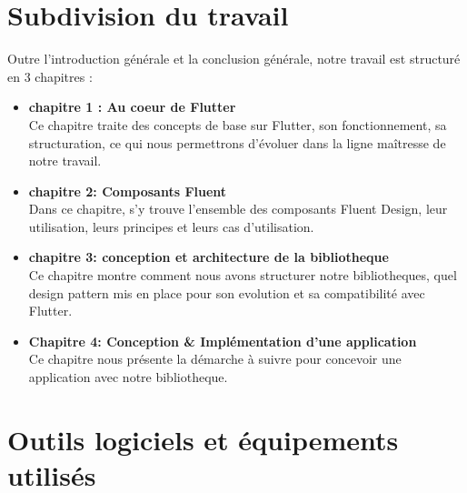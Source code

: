 \documentclass[a4paper,12pt]{report}
\begin{document}
                
            \section*{Subdivision du travail}
                Outre l’introduction générale et la conclusion générale, 
                notre travail est structuré en 3 chapitres :
                \begin{itemize}
                    \item \textbf{chapitre 1 : Au coeur de Flutter}
                    \\
                        Ce chapitre traite des concepts de base sur Flutter, son fonctionnement, sa structuration,  
                        ce qui nous permettrons
                        d’évoluer dans la ligne maîtresse de notre travail.
                    

                    \item \textbf{chapitre 2: Composants Fluent}
                    \\
                        Dans ce chapitre, s'y trouve l'ensemble des composants Fluent Design,
                        leur utilisation, leurs principes et leurs cas d'utilisation.
                    
                    
                    \item \textbf{chapitre 3: conception et architecture de la bibliotheque}
                    \\
                        Ce chapitre montre comment nous avons structurer notre bibliotheques,
                        quel design pattern mis en place pour son evolution et sa compatibilité avec Flutter.
                    
                    
                    \item \textbf{Chapitre 4: Conception & Implémentation d'une application }
                    \\
                        Ce chapitre nous présente la démarche à suivre pour concevoir une
                        application avec notre bibliotheque.
                        
                \end{itemize}
            
            \section*{Outils logiciels et équipements utilisés}
\end{document}
